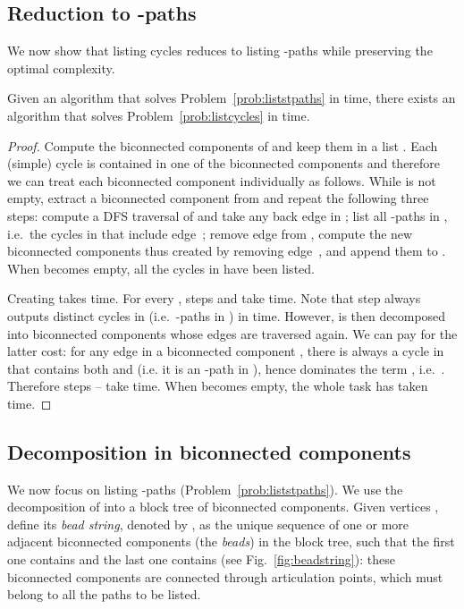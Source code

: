 \subsection{Reduction to -paths}
\label{sub:reduction-paths}

We now show that listing cycles reduces to listing -paths while
preserving the optimal complexity.  

\begin{lemma}
  \label{lemma:reduction}
  Given an algorithm that solves Problem~\ref{prob:liststpaths} in
  \mbox{}
  time, there exists an algorithm that solves
  Problem~\ref{prob:listcycles} in \mbox{} time.
\end{lemma}
\begin{proof}
  Compute the biconnected components of  and keep them in a list
  . Each (simple) cycle is contained in one of the biconnected
  components and therefore we can treat each biconnected component
  individually as follows. While  is not empty, extract a biconnected
  component  from  and repeat the following three
  steps:  compute a DFS traversal of  and take any back edge
   in ;  list all -paths in , i.e.~the
  cycles in  that include edge~;  remove edge  from
  , compute the new biconnected components thus created by removing
  edge~, and append them to . When  becomes empty, all the
  cycles in  have been listed.

  Creating  takes  time. For every , steps  and
   take  time.  Note that step  always outputs
  distinct cycles in  (i.e.~-paths in ) in
   time.
  However,  is then decomposed into biconnected components whose
  edges are traversed again. We can pay for the latter cost: for any
  edge  in a biconnected component , there is always a
  cycle in  that contains both  and  (i.e.\mbox{} it is an
  -path in ), hence  dominates the term ,
  i.e.~.  Therefore steps -- take  time. When  becomes empty,
  the whole task has taken 
  time.
\end{proof}


\subsection{Decomposition in biconnected components}
\label{sec:decomposition}


We now focus on listing -paths
(Problem~\ref{prob:liststpaths}). We use the decomposition of  into
a block tree of biconnected components.  Given vertices , define
its \emph{bead string}, denoted by , as the unique
sequence of one or more adjacent biconnected components (the
\emph{beads}) in the block tree, such that the first one contains 
and the last one contains  (see Fig.~\ref{fig:beadstring}): these
biconnected components are connected through articulation points,
which must belong to all the paths to be listed.

